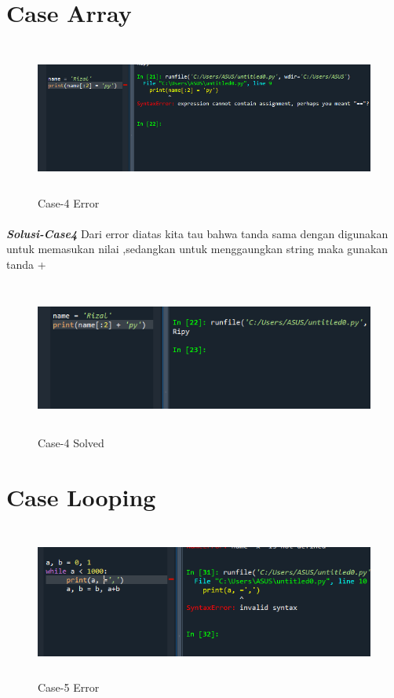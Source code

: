 \documentclass[12pt,a4paper]{article}
\begin{document}
\newpage
\section{Case Array}
\begin{figure}[ht]
    \centerline{\includegraphics[width=15cm,height=5cm]{image/case4.png}}
    \renewcommand{\figurename}{Gambar}
    \caption{Case-4 Error}
\end{figure}
\paragraph{}\textbf{\textit{Solusi-Case4}} { Dari error diatas kita tau bahwa tanda sama dengan digunakan untuk memasukan nilai ,sedangkan untuk menggaungkan string maka gunakan tanda +}
\begin{figure}[ht]
    \centerline{\includegraphics[width=15cm,height=5cm]{image/case4-solved.png}}
    \renewcommand{\figurename}{Gambar}
    \caption{Case-4 Solved}
\end{figure}

\newpage
\section{Case Looping}
\begin{figure}[ht]
    \centerline{\includegraphics[width=15cm,height=5cm]{image/case5.png}}
    \renewcommand{\figurename}{Gambar}
    \caption{Case-5 Error}
\end{figure}
\end{document}
